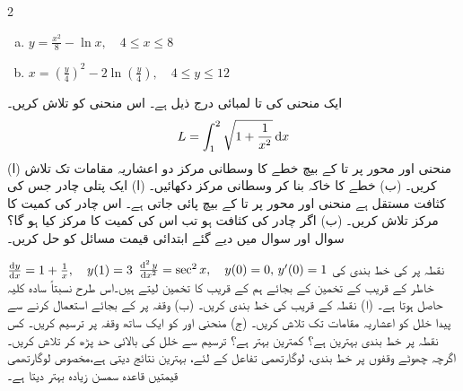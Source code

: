 \begin{multicols}{2}
\begin{enumerate}[a.]
\item
$y=\tfrac{x^2}{8}-\ln x,\quad 4\le x\le 8$
\item
$x=(\tfrac{y}{4})^2-2\ln(\tfrac{y}{4}),\quad 4\le y\le 12$
\end{enumerate}
\end{multicols}
ایک منحنی کی  تا  لمبائی درج ذیل ہے۔ اس منحنی کو تلاش کریں۔
\begin{align*}
L=\int_1^2\sqrt{1+\frac{1}{x^2}}\dif x
\end{align*}
(ا) منحنی  اور محور  پر  تا  کے بیچ خطے کا وسطانی مرکز دو اعشاریہ مقامات تک    تلاش کریں۔ (ب) خطے کا خاکہ بنا کر وسطانی مرکز دکھائیں۔
(ا) ایک پتلی چادر جس کی کثافت مستقل ہے منحنی  اور محور  پر  تا  کے بیچ پائی  جاتی ہے۔ اس چادر کی کمیت کا مرکز تلاش کریں۔ (ب) اگر چادر کی کثافت  ہو تب اس کی کمیت کا مرکز کیا ہو گا؟
سوال  اور سوال  میں دیے  گئے ابتدائی قیمت مسائل کو حل کریں۔

$\frac{\dif y}{\dif x}=1+\frac{1}{x},\quad y(1)=3$
$\frac{\dif^{\,2} y}{\dif x^2}=\sec^2 x, \quad y(0)=0,\, y'(0)=1$
نقطہ  پر  کی خط بندی کی خاطر  کے قریب  کے تخمین کے بجائے ہم  کے قریب  کا  تخمین لیتے ہیں۔اس طرح نسبتاً سادہ کلیہ حاصل ہوتا ہے۔ (ا) نقطہ  کے قریب  کی خط بندی کریں۔ (ب) وقفہ  پر  کے بجائے   استعمال کرنے سے پیدا خلل کو  اعشاریہ  مقامات تک تلاش کریں۔ (ج) منحنی  اور  کو ایک ساتھ وقفہ  پر ترسیم کریں۔ کس نقطہ پر خط بندی بہترین ہے؟  کمترین   بہتر  ہے؟ ترسیم سے خلل  کی بالائی حد  پڑھ کر تلاش کریں۔
اگرچہ چھوٹے وقفوں  پر خط بندی، لوگارتھمی تفاعل کے لئے، بہترین نتائج  دیتی  ہے،مخصوص  لوگارتھمی   قیمتیں قاعدہ سمسن  زیادہ بہتر   دیتا ہے۔

